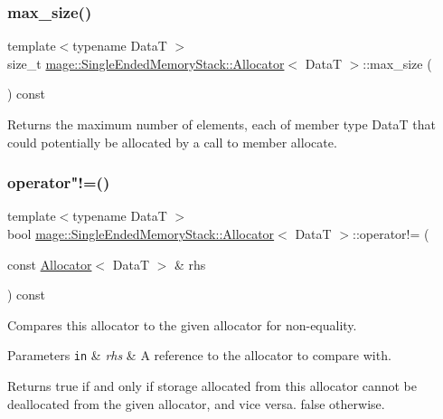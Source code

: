 \subsubsection{\texorpdfstring{max\+\_\+size()}{max\_size()}}
{\footnotesize\ttfamily template$<$typename DataT $>$ \\
size\+\_\+t \hyperlink{structmage_1_1_single_ended_memory_stack_1_1_allocator}{mage\+::\+Single\+Ended\+Memory\+Stack\+::\+Allocator}$<$ DataT $>$\+::max\+\_\+size (\begin{DoxyParamCaption}{ }\end{DoxyParamCaption}) const\hspace{0.3cm}{\ttfamily [noexcept]}}

Returns the maximum number of elements, each of member type {\ttfamily DataT} that could potentially be allocated by a call to member allocate. \hypertarget{structmage_1_1_single_ended_memory_stack_1_1_allocator_a671edfb0489c30d545b5b513a0fa3b6e}{}\label{structmage_1_1_single_ended_memory_stack_1_1_allocator_a671edfb0489c30d545b5b513a0fa3b6e} 
\subsubsection{\texorpdfstring{operator"!=()}{operator!=()}}
{\footnotesize\ttfamily template$<$typename DataT $>$ \\
bool \hyperlink{structmage_1_1_single_ended_memory_stack_1_1_allocator}{mage\+::\+Single\+Ended\+Memory\+Stack\+::\+Allocator}$<$ DataT $>$\+::operator!= (\begin{DoxyParamCaption}\item[{const \hyperlink{structmage_1_1_single_ended_memory_stack_1_1_allocator}{Allocator}$<$ DataT $>$ \&}]{rhs }\end{DoxyParamCaption}) const\hspace{0.3cm}{\ttfamily [noexcept]}}

Compares this allocator to the given allocator for non-\/equality.


\begin{DoxyParams}[1]{Parameters}
\mbox{\tt in}  & {\em rhs} & A reference to the allocator to compare with. \\
\hline
\end{DoxyParams}
\begin{DoxyReturn}{Returns}
{\ttfamily true} if and only if storage allocated from this allocator cannot be deallocated from the given allocator, and vice versa. {\ttfamily false} otherwise. 
\end{DoxyReturn}
\hypertarget{structmage_1_1_single_ended_memory_stack_1_1_allocator_a926d9a1415758f188e23ed633ef08ae0}{}\label{structmage_1_1_single_ended_memory_stack_1_1_allocator_a926d9a1415758f188e23ed633ef08ae0} 
